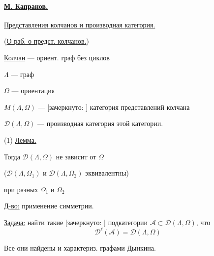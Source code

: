 \paragraph*{\underline{\underline{М. Капранов.}}}
\underline{Представления колчанов и производная категория.}

(\underline{О раб. 
о предст. колчанов.})

\underline{Колчан} — ориент. граф без циклов

\begin{center}
\end{center}
$\Lambda$ — граф

$\Omega$ — ориентация

$M(\Lambda,\Omega)$ —
[зачеркнуто: ]
категория представлений колчана

$\mathcal D(\Lambda,\Omega)$ — производная категория этой категории.

(1) \underline{Лемма.}

Тогда $\mathcal D(\Lambda,\Omega)$ не зависит от $\Omega$

($\mathcal D(\Lambda,\Omega_1)$ и $\mathcal D(\Lambda,\Omega_2)$ эквивалентны)

при разных $\Omega_1$ и $\Omega_2$

\underline{Д-во:} применение симметрии.

\underline{Задача:} найти такие
[зачеркнуто: ]
подкатегории $\mathcal A\subset\mathcal D(\Lambda,\Omega)$,
что
\begin{equation*}
\mathcal D^{\ell}(\mathcal A)=\mathcal D(\Lambda,\Omega)
\end{equation*}

Все они найдены и характериз. графами Дынкина.

